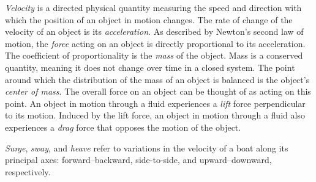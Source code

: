 \documentclass[a4paper,landscape,oneside]{article}
\begin{document}
\small{
\emph{Velocity} is a directed physical quantity measuring the speed and direction with which the position of an object in motion changes.
The rate of change of the velocity of an object is its \emph{acceleration}.
As described by Newton's second law of motion, the \emph{force} acting on an object is directly proportional to its acceleration.
The coefficient of proportionality is the \emph{mass} of the object.
Mass is a conserved quantity, meaning it does not change over time in a closed system.
The point around which the distribution of the mass of an object is balanced is the object's \emph{center of mass}.
The overall force on an object can be thought of as acting on this point.
An object in motion through a fluid experiences a \emph{lift} force perpendicular to its motion.
Induced by the lift force, an object in motion through a fluid also experiences a \emph{drag} force that opposes the motion of the object.

\emph{Surge}, \emph{sway}, and \emph{heave} refer to variations in the velocity of a boat along its principal axes: forward--backward, side-to-side, and upward--downward, respectively.
}
\end{document}
